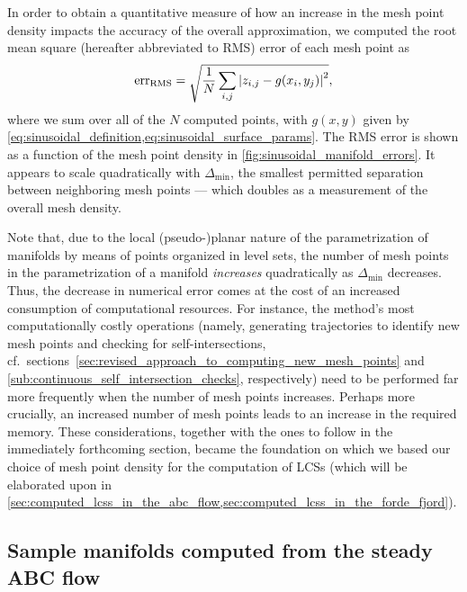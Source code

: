 



In order to obtain a quantitative measure of how an increase in the mesh
point density impacts the accuracy of the overall approximation, we
computed the root mean square (hereafter abbreviated to RMS) error of each mesh
point as
\begin{equation}
    \label{eq:sinusoidal_rms}
    \text{err}_{\text{RMS}} = \sqrt{\frac{1}{N}%
    \sum\limits_{i,j}\abs{z_{i,j}-g(x_{i},y_{j})}^{2}},
\end{equation}
where we sum over all of the $N$ computed points, with $g(x,y)$ given
by \cref{eq:sinusoidal_definition,eq:sinusoidal_surface_params}.
The RMS error is shown as a function of the mesh point density in
\cref{fig:sinusoidal_manifold_errors}. It appears to scale quadratically
with $\Delta_{\min}$, the smallest permitted separation between neighboring
mesh points --- which doubles as a measurement of the overall mesh density.



Note that, due to the local (pseudo-)planar nature of the parametrization of
manifolds by means of points organized in level sets, the number of mesh points
in the parametrization of a manifold \emph{increases} quadratically as
$\Delta_{\min}$ decreases. Thus, the decrease in numerical error comes at the
cost of an increased consumption of computational resources. For instance,
the method's most computationally costly operations (namely, generating
trajectories to identify new mesh points and checking for self-intersections,
cf.\ sections~\ref{sec:revised_approach_to_computing_new_mesh_points} and
\ref{sub:continuous_self_intersection_checks}, respectively) need to be
performed far more frequently when the number of mesh points increases.
Perhaps more crucially, an increased number of mesh points leads to an
increase in the required memory. These considerations, together with the
ones to follow in the immediately forthcoming section, became the foundation
on which we based our choice of mesh point density for the computation of
LCSs (which will be elaborated upon in
\cref{sec:computed_lcss_in_the_abc_flow,sec:computed_lcss_in_the_forde_fjord}).

\subsection{Sample manifolds computed from the steady ABC flow}
\label{sub:sample_manifolds_computed_from_the_steady_abc_flow}

